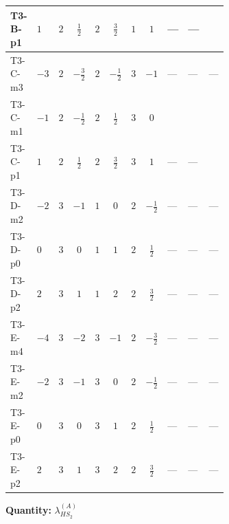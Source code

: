 \documentclass[8pt]{article}
\begin{document}
\begin{landscape}
\begin{longtable}{@{}llcccccc >{\raggedright\arraybackslash}p{0.21\linewidth} >{\raggedright\arraybackslash}p{0.21\linewidth} >{\raggedright\arraybackslash}p{0.21\linewidth}@{}}
\midrule
T3-B-p1 & $1$ & $2$ & $\frac{1}{2}$ & $2$ & $\frac{3}{2}$ & $1$ & $1$ & --- & --- & \scriptsize\adjustbox{max width=\linewidth}{$\begin{gathered} +{g_1}^2 \left(18 {g_2}^2-15 {\lambda_{HS_2}^{(A)}}\right)\end{gathered}$} \\
\midrule
T3-C-m3 & $-3$ & $2$ & $-\frac{3}{2}$ & $2$ & $-\frac{1}{2}$ & $3$ & $-1$ & --- & --- & --- \\
\midrule
T3-C-m1 & $-1$ & $2$ & $-\frac{1}{2}$ & $2$ & $\frac{1}{2}$ & $3$ & $0$ & \scriptsize\adjustbox{max width=\linewidth}{$\begin{gathered} -4 {\lambda_{10}} \left({\lambda_{H H^\dagger S_1^\dagger S_2^\dagger}^{\rm Cross}}\right)^{*}\end{gathered}$} & \scriptsize\adjustbox{max width=\linewidth}{$\begin{gathered} +64 {\lambda_{8}} \left({\lambda_{8}}\right)^{*}\end{gathered}$} & \scriptsize\adjustbox{max width=\linewidth}{$\begin{gathered} +{g_1}^2 \left(6 {g_2}^2-3 {\lambda_{HS_2}^{(A)}}\right)\end{gathered}$} \\
\midrule
T3-C-p1 & $1$ & $2$ & $\frac{1}{2}$ & $2$ & $\frac{3}{2}$ & $3$ & $1$ & --- & --- & \scriptsize\adjustbox{max width=\linewidth}{$\begin{gathered} +{g_1}^2 \left(18 {g_2}^2-15 {\lambda_{HS_2}^{(A)}}\right)\end{gathered}$} \\
\midrule
T3-D-m2 & $-2$ & $3$ & $-1$ & $1$ & $0$ & $2$ & $-\frac{1}{2}$ & --- & --- & --- \\
\midrule
T3-D-p0 & $0$ & $3$ & $0$ & $1$ & $1$ & $2$ & $\frac{1}{2}$ & --- & --- & --- \\
\midrule
T3-D-p2 & $2$ & $3$ & $1$ & $1$ & $2$ & $2$ & $\frac{3}{2}$ & --- & --- & --- \\
\midrule
T3-E-m4 & $-4$ & $3$ & $-2$ & $3$ & $-1$ & $2$ & $-\frac{3}{2}$ & --- & --- & --- \\
\midrule
T3-E-m2 & $-2$ & $3$ & $-1$ & $3$ & $0$ & $2$ & $-\frac{1}{2}$ & --- & --- & --- \\
\midrule
T3-E-p0 & $0$ & $3$ & $0$ & $3$ & $1$ & $2$ & $\frac{1}{2}$ & --- & --- & --- \\
\midrule
T3-E-p2 & $2$ & $3$ & $1$ & $3$ & $2$ & $2$ & $\frac{3}{2}$ & --- & --- & --- \\
\midrule
\bottomrule
\end{longtable}
\clearpage
\noindent\textbf{Quantity: }$\lambda_{HS_2}^{(A)}$\par\smallskip

\end{landscape}
\end{document}
